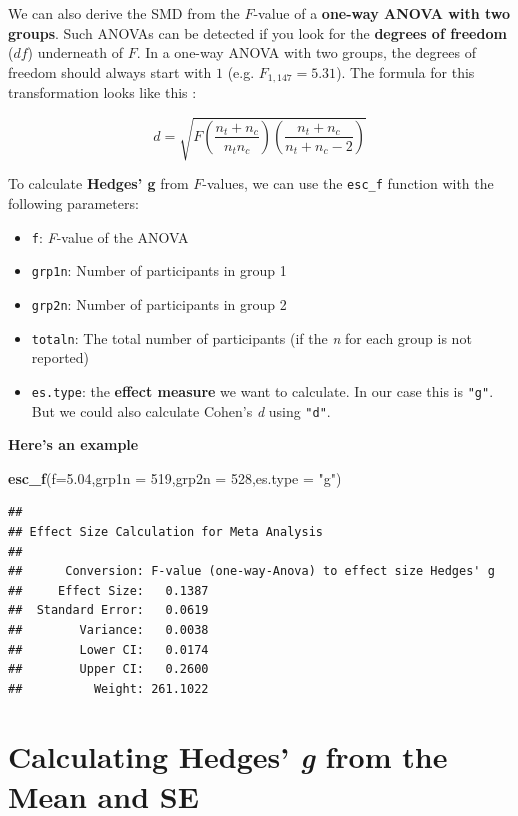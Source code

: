 \documentclass[]{book}
\newenvironment{Shaded}{\begin{snugshade}}{\end{snugshade}}
\newcommand{\DataTypeTok}[1]{\textcolor[rgb]{0.13,0.29,0.53}{#1}}
\newcommand{\DecValTok}[1]{\textcolor[rgb]{0.00,0.00,0.81}{#1}}
\newcommand{\FloatTok}[1]{\textcolor[rgb]{0.00,0.00,0.81}{#1}}
\newcommand{\KeywordTok}[1]{\textcolor[rgb]{0.13,0.29,0.53}{\textbf{#1}}}
\newcommand{\NormalTok}[1]{#1}
\newcommand{\StringTok}[1]{\textcolor[rgb]{0.31,0.60,0.02}{#1}}
\providecommand{\tightlist}{%
  \setlength{\itemsep}{0pt}\setlength{\parskip}{0pt}}
\begin{document}
We can also derive the SMD from the \(F\)-value of a \textbf{one-way ANOVA with two groups}. Such ANOVAs can be detected if you look for the \textbf{degrees of freedom} (\(df\)) underneath of \(F\). In a one-way ANOVA with two groups, the degrees of freedom should always start with \(1\) (e.g. \(F_{1,147}=5.31\)). The formula for this transformation looks like this \citep{cohen1992power, rosnow1996computing, rosnow2000contrasts}:

\[d = \sqrt{  F(\frac{n_t+n_c}{n_t n_c})(\frac{n_t+n_c}{n_t+n_c-2})}\]

To calculate \textbf{Hedges' g} from \(F\)-values, we can use the \texttt{esc\_f} function with the following parameters:

\begin{itemize}
\tightlist
\item
  \texttt{f}: \emph{F}-value of the ANOVA
\item
  \texttt{grp1n}: Number of participants in group 1
\item
  \texttt{grp2n}: Number of participants in group 2
\item
  \texttt{totaln}: The total number of participants (if the \emph{n} for each group is not reported)
\item
  \texttt{es.type}: the \textbf{effect measure} we want to calculate. In our case this is \texttt{"g"}. But we could also calculate Cohen's \emph{d} using \texttt{"d"}.
\end{itemize}

\textbf{Here's an example}

\begin{Shaded}
\begin{Highlighting}[]
\KeywordTok{esc_f}\NormalTok{(}\DataTypeTok{f=}\FloatTok{5.04}\NormalTok{,}\DataTypeTok{grp1n =} \DecValTok{519}\NormalTok{,}\DataTypeTok{grp2n =} \DecValTok{528}\NormalTok{,}\DataTypeTok{es.type =} \StringTok{"g"}\NormalTok{)}
\end{Highlighting}
\end{Shaded}

\begin{verbatim}
## 
## Effect Size Calculation for Meta Analysis
## 
##      Conversion: F-value (one-way-Anova) to effect size Hedges' g
##     Effect Size:   0.1387
##  Standard Error:   0.0619
##        Variance:   0.0038
##        Lower CI:   0.0174
##        Upper CI:   0.2600
##          Weight: 261.1022
\end{verbatim}

\hypertarget{e}{%
\section{\texorpdfstring{Calculating Hedges' \emph{g} from the Mean and SE}{Calculating Hedges' g from the Mean and SE}}\label{e}}
\end{document}
